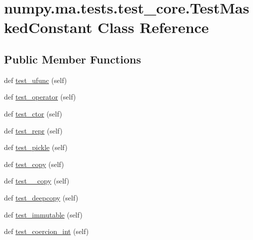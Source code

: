 \hypertarget{classnumpy_1_1ma_1_1tests_1_1test__core_1_1TestMaskedConstant}{}\section{numpy.\+ma.\+tests.\+test\+\_\+core.\+Test\+Masked\+Constant Class Reference}
\label{classnumpy_1_1ma_1_1tests_1_1test__core_1_1TestMaskedConstant}
\subsection*{Public Member Functions}
\begin{DoxyCompactItemize}
\item 
def \hyperlink{classnumpy_1_1ma_1_1tests_1_1test__core_1_1TestMaskedConstant_a5418fb15f1c849c5aefa020ae3bf0fa4}{test\+\_\+ufunc} (self)
\item 
def \hyperlink{classnumpy_1_1ma_1_1tests_1_1test__core_1_1TestMaskedConstant_a2edd3ebc8dd4e9ce8aad128122688898}{test\+\_\+operator} (self)
\item 
def \hyperlink{classnumpy_1_1ma_1_1tests_1_1test__core_1_1TestMaskedConstant_a034fa10eb0fdd12b55f2267f6f7fb7b5}{test\+\_\+ctor} (self)
\item 
def \hyperlink{classnumpy_1_1ma_1_1tests_1_1test__core_1_1TestMaskedConstant_a4af98bfa45221cc9b74ee789e4e80d68}{test\+\_\+repr} (self)
\item 
def \hyperlink{classnumpy_1_1ma_1_1tests_1_1test__core_1_1TestMaskedConstant_ae82b52db8f5c321f40f4bd0e02d6b00f}{test\+\_\+pickle} (self)
\item 
def \hyperlink{classnumpy_1_1ma_1_1tests_1_1test__core_1_1TestMaskedConstant_ab6e5a8c50433ad71f526b378a81092fb}{test\+\_\+copy} (self)
\item 
def \hyperlink{classnumpy_1_1ma_1_1tests_1_1test__core_1_1TestMaskedConstant_a76a882c334cfc1bdd463eb50c48c3cf7}{test\+\_\+\+\_\+copy} (self)
\item 
def \hyperlink{classnumpy_1_1ma_1_1tests_1_1test__core_1_1TestMaskedConstant_aee3d748869b3d435e6f45eead551bc24}{test\+\_\+deepcopy} (self)
\item 
def \hyperlink{classnumpy_1_1ma_1_1tests_1_1test__core_1_1TestMaskedConstant_acd54f842bc4bb40da88186f8f5f96621}{test\+\_\+immutable} (self)
\item 
def \hyperlink{classnumpy_1_1ma_1_1tests_1_1test__core_1_1TestMaskedConstant_a3a1b7e647bf6e1799ca37ecc4074efb7}{test\+\_\+coercion\+\_\+int} (self)

\end{DoxyCompactItemize}
